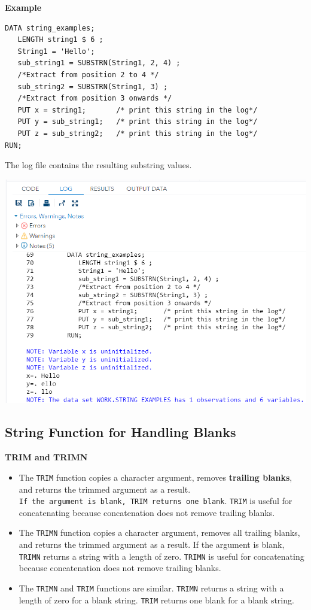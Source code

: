 \documentclass[
]{book}
\begin{document}
\textbf{Example}

\begin{verbatim}
DATA string_examples;
   LENGTH string1 $ 6 ;
   String1 = 'Hello';
   sub_string1 = SUBSTRN(String1, 2, 4) ;
   /*Extract from position 2 to 4 */
   sub_string2 = SUBSTRN(String1, 3) ;
   /*Extract from position 3 onwards */
   PUT x = string1;       /* print this string in the log*/
   PUT y = sub_string1;   /* print this string in the log*/
   PUT z = sub_string2;   /* print this string in the log*/
RUN;
\end{verbatim}

The log file contains the resulting substring values.

\begin{center}\includegraphics[width=1\linewidth]{img10/w10-SUBSTR-log01} \end{center}

\hypertarget{string-function-for-handling-blanks}{%
\subsection{String Function for Handling Blanks}\label{string-function-for-handling-blanks}}

\textbf{TRIM and TRIMN}

\begin{itemize}
\item
  The \texttt{TRIM} function copies a character argument, removes \textbf{trailing blanks}, and returns the trimmed argument as a result. \texttt{If\ the\ argument\ is\ blank,\ TRIM\ returns\ one\ blank}. \texttt{TRIM} is useful for concatenating because concatenation does not remove trailing blanks.
\item
  The \texttt{TRIMN} function copies a character argument, removes all trailing blanks, and returns the trimmed argument as a result. If the argument is blank, \texttt{TRIMN} returns a string with a length of zero. \texttt{TRIMN} is useful for concatenating because concatenation does not remove trailing blanks.
\item
  The \texttt{TRIMN} and \texttt{TRIM} functions are similar. \texttt{TRIMN} returns a string with a length of zero for a blank string. \texttt{TRIM} returns one blank for a blank string.
\end{itemize}
\end{document}
